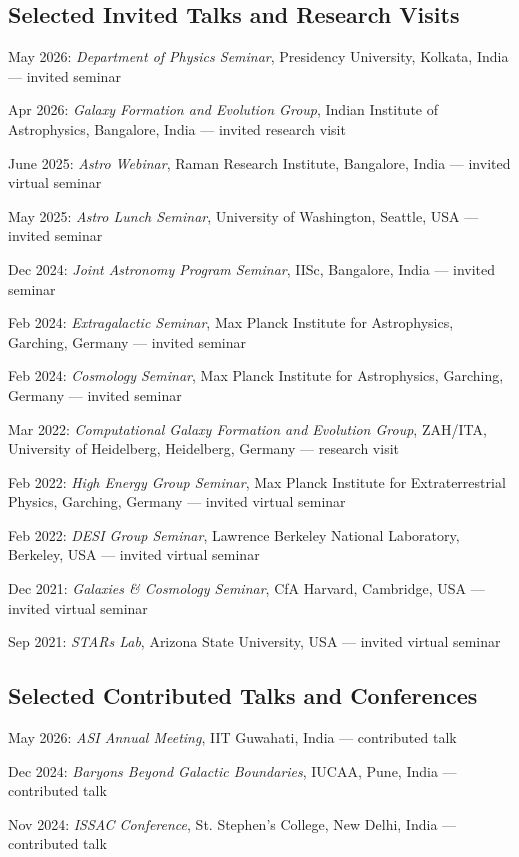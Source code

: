 \documentclass[12pt,letterpaper]{article}
\begin{document}
\subsection{Selected Invited Talks and Research Visits}
\vspace{-1mm}
\begin{list}{}{\cvlist}
\item May 2026: \emph{Department of Physics Seminar}, Presidency University, Kolkata, India --- invited seminar
\item Apr 2026: \emph{Galaxy Formation and Evolution Group}, Indian Institute of Astrophysics, Bangalore, India --- invited research visit
\item June 2025: \emph{Astro Webinar}, Raman Research Institute, Bangalore, India --- invited virtual seminar
\item May 2025: \emph{Astro Lunch Seminar}, University of Washington, Seattle, USA --- invited seminar
\item Dec 2024: \emph{Joint Astronomy Program Seminar}, IISc, Bangalore, India --- invited seminar
\item Feb 2024: \emph{Extragalactic Seminar}, Max Planck Institute for Astrophysics, Garching, Germany --- invited seminar
\item Feb 2024: \emph{Cosmology Seminar}, Max Planck Institute for Astrophysics, Garching, Germany --- invited seminar
\item Mar 2022: \emph{Computational Galaxy Formation and Evolution Group}, ZAH/ITA, University of Heidelberg, Heidelberg, Germany --- research visit
\item Feb 2022: \emph{High Energy Group Seminar}, Max Planck Institute for Extraterrestrial Physics, Garching, Germany --- invited virtual seminar
\item Feb 2022: \emph{DESI Group Seminar}, Lawrence Berkeley National Laboratory, Berkeley, USA --- invited virtual seminar
\item Dec 2021: \emph{Galaxies \& Cosmology Seminar}, CfA Harvard, Cambridge, USA --- invited virtual seminar
\item Sep 2021: \emph{STARs Lab}, Arizona State University, USA --- invited virtual seminar
\end{list}

\vspace{-1.5mm}
\subsection{Selected Contributed Talks and Conferences}
\begin{list}{}{\cvlist}
\item May 2026: \emph{ASI Annual Meeting}, IIT Guwahati, India --- contributed talk
\item Dec 2024: \emph{Baryons Beyond Galactic Boundaries}, IUCAA, Pune, India --- contributed talk
\item Nov 2024: \emph{ISSAC Conference}, St. Stephen's College, New Delhi, India --- contributed talk
\end{list}
\vspace{-1.5mm}
\end{document}
